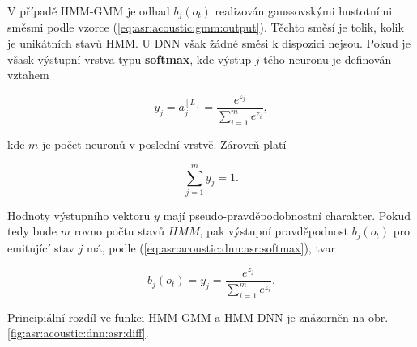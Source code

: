 V případě HMM-GMM je odhad $b_j\left(o_t\right)$ realizován gaussovskými hustotními směsmi podle vzorce (\ref{eq:asr:acoustic:gmm:output}). Těchto směsí je tolik, kolik je unikátních stavů HMM. U DNN však žádné směsi k dispozici nejsou. Pokud je všask výstupní vrstva typu \textbf{softmax}, kde výstup $j$-tého neuronu je definován vztahem

\begin{equation}
  y_{j} = a_{j}^{[L]} = \frac{e^{z_j}}{\sum_{i=1}^{m}e^{z_i}},
  \label{eq:asr:acoustic:dnn:asr:softmax}
\end{equation}

\noindent kde $m$ je počet neuronů v poslední vrstvě. Zároveň platí

\begin{equation}
  \sum_{j=1}^{m} y_{j} = 1.
  \label{eq:asr:acoustic:dnn:asr:softmax:criterium}
\end{equation}

\noindent Hodnoty výstupního vektoru $y$ mají pseudo-pravděpodobnostní charakter. Pokud tedy bude $m$ rovno počtu stavů $HMM$, pak výstupní pravděpodnost $b_{j} \left(o_t\right)$ pro emitující stav $j$ má, podle (\ref{eq:asr:acoustic:dnn:asr:softmax}), tvar

\begin{equation}
  b_{j} \left(o_t\right) = y_{j} = \frac{e^{z_j}}{\sum_{i=1}^{m}e^{z_i}}.
  \label{eq:asr:acoustic:dnn:asr:softmax:criterium}
\end{equation}

\noindent Principiální rozdíl ve funkci HMM-GMM a HMM-DNN je znázorněn na obr. \ref{fig:asr:acoustic:dnn:asr:diff}.


